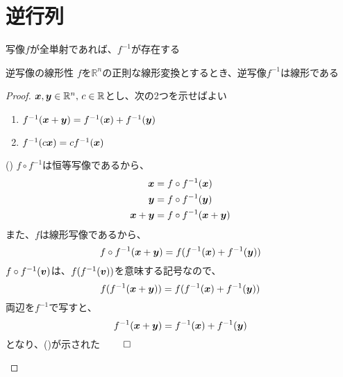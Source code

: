 \documentclass[../../../topic_linear-algebra]{subfiles}
\begin{document}
\sectionline
\section{逆行列}

写像$f$が全単射であれば、$f^{-1}$が存在する

\begin{theorem}{逆写像の線形性}
  $f$を$\mathbb{R}^n$の正則な線形変換とするとき、逆写像$f^{-1}$は線形である
\end{theorem}

\begin{proof}
  $\vb*{x},\vb*{y} \in \mathbb{R}^n,\, c \in \mathbb{R}$とし、次の2つを示せばよい
  \begin{enumerate}[label=\romanlabel]
    \item $f^{-1}(\vb*{x} + \vb*{y}) = f^{-1}(\vb*{x}) + f^{-1}(\vb*{y})$
    \item $f^{-1}(c\vb*{x}) = c f^{-1}(\vb*{x})$
  \end{enumerate}

  \begin{subpattern}{()}
    $f \circ f^{-1}$は恒等写像であるから、
    \begin{align*}
      \vb*{x}           & = f \circ f^{-1}(\vb*{x})           \\
      \vb*{y}           & = f \circ f^{-1}(\vb*{y})           \\
      \vb*{x} + \vb*{y} & = f \circ f^{-1}(\vb*{x} + \vb*{y})
    \end{align*}
    また、$f$は線形写像であるから、
    \begin{equation*}
      f \circ f^{-1}(\vb*{x} + \vb*{y}) = f(f^{-1}(\vb*{x}) + f^{-1}(\vb*{y}))
    \end{equation*}
    $f \circ f^{-1}(\vb*{v})$は、$f (f^{-1}(\vb*{v}))$を意味する記号なので、
    \begin{equation*}
      f(f^{-1}(\vb*{x}+\vb*{y})) = f(f^{-1}(\vb*{x}) + f^{-1}(\vb*{y}))
    \end{equation*}
    両辺を$f^{-1}$で写すと、
    \begin{equation*}
      f^{-1}(\vb*{x} + \vb*{y}) = f^{-1}(\vb*{x}) + f^{-1}(\vb*{y})
    \end{equation*}
    となり、()が示された $\qed$
  \end{subpattern}


\end{proof}
\end{document}
